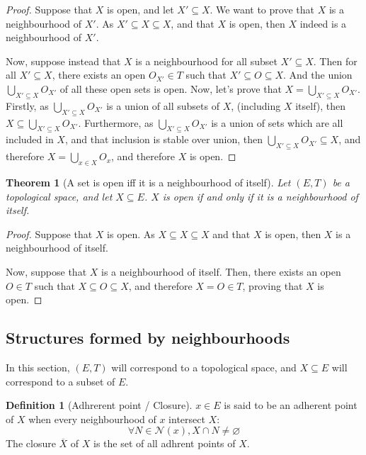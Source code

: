 \documentclass{article}
\newtheorem{theorem}{Theorem}[section]
\theoremstyle{definition}
\newtheorem{definition}{Definition}[section]
\theoremstyle{remark}
\theoremstyle{example}
\theoremstyle{notation}
\begin{document}
\begin{proof}
		Suppose that $X$ is open, and let $X' \subseteq X$. We want to prove that $X$ is a neighbourhood of $X'$. As $X' \subseteq X \subseteq X$, and that $X$ is open, then $X$ indeed is a neighbourhood of $X'$.

		Now, suppose instead that $X$ is a neighbourhood for all subset $X' \subseteq X$. Then for all $X' \subseteq X$, there exists an open $O_{X'} \in T$ such that $X' \subseteq O \subseteq X$. And the union $\bigcup_{X' \subseteq X} O_{X'}$ of all these open sets is open. Now, let's prove that $X = \bigcup_{X' \subseteq X} O_{X'}$. Firstly, as $\bigcup_{X' \subseteq X} O_{X'}$ is a union of all subsets of $X$, (including $X$ itself), then $X \subseteq \bigcup_{X' \subseteq X} O_{X'}$. Furthermore, as $\bigcup_{X' \subseteq X} O_{X'}$ is a union of sets which are all included in $X$, and that inclusion is stable over union, then $\bigcup_{X' \subseteq X} O_{X'} \subseteq X$, and therefore $X = \bigcup_{x \in X} O_x$, and therefore $X$ is open.
\end{proof}

\begin{theorem}[A set is open iff it is a neighbourhood of itself]
		Let $(E, T)$ be a topological space, and let $X \subseteq E$. $X$ is open if and only if it is a neighbourhood of itself.
\end{theorem}

\begin{proof}
		Suppose that $X$ is open. As $X \subseteq X \subseteq X$ and that $X$ is open, then $X$ is a neighbourhood of itself.

		Now, suppose that $X$ is a neighbourhood of itself. Then, there exists an open $O \in T$ such that $X \subseteq O \subseteq X$, and therefore $X = O \in T$, proving that $X$ is open.
\end{proof}

\subsection{Structures formed by neighbourhoods}

In this section, $(E, T)$ will correspond to a topological space, and $X \subseteq E$ will correspond to a subset of $E$.

\begin{definition}[Adhrerent point / Closure]
		$x \in E$ is said to be an adherent point of $X$ when every neighbourhood of $x$ intersect $X$:
				$$\forall N \in \mathcal{N}(x), X \cap N \neq \varnothing$$
		The closure $\overline{X}$ of $X$ is the set of all adhrent points of $X$.
\end{definition}
\end{document}
